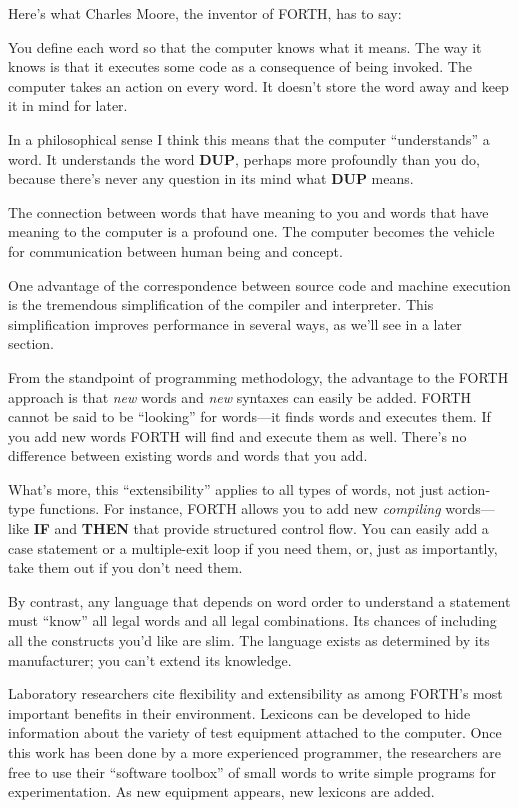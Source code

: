 
\bigskip\blackline{2ex}
Here's what Charles Moore, the inventor of FORTH, has to say:

\begin{tfquot}
You define each word so that the computer knows what it means. The
way it knows is that it executes some code as a consequence of being
invoked. The computer takes an action on every word. It doesn't store
the word away and keep it in mind for later.

In a philosophical sense I think this means that the computer {}``understands''
a word. It understands the word \textbf{DUP}, perhaps more profoundly
than you do, because there's never any question in its mind what \textbf{DUP}
means.

The connection between words that have meaning to you and words that
have meaning to the computer is a profound one. The computer becomes
the vehicle for communication between human being and concept.
\end{tfquot}
\blackline{1ex}
One advantage of the correspondence between source code and machine
execution is the tremendous simplification of the compiler and interpreter.
This simplification improves performance in several ways, as we'll
see in a later section.

From the standpoint of programming methodology, the advantage to the
FORTH approach is that \emph{new} words and \emph{new} syntaxes can
easily be added. FORTH cannot be said to be {}``looking'' for words---it
finds words and executes them. If you add new words FORTH will find
and execute them as well. There's no difference between existing words
and words that you add.

What's more, this {}``extensibility'' applies to all types of words,
not just action-type functions. For instance, FORTH allows you to
add new \emph{compiling} words---like \textbf{IF} and \textbf{THEN}
that provide structured control flow. You can easily add a case statement
or a multiple-exit loop if you need them, or, just as importantly,
take them out if you don't need them.

By contrast, any language that depends on word order to understand
a statement must {}``know'' all legal words and all legal combinations.
Its chances of including all the constructs you'd like are slim. The
language exists as determined by its manufacturer; you can't extend
its knowledge.

Laboratory researchers cite flexibility and extensibility as among
FORTH's most important benefits in their environment. Lexicons can
be developed to hide information about the variety of test equipment
attached to the computer. Once this work has been done by a more experienced
programmer, the researchers are free to use their {}``software toolbox''
of small words to write simple programs for experimentation. As new
equipment appears, new lexicons are added.

